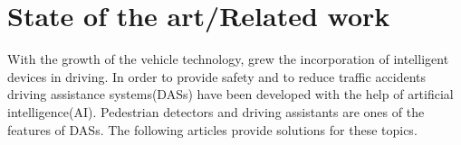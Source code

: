 \documentclass[runningheads,a4paper,11pt]{report}
\begin{document}
\chapter{State of the art/Related work}
\label{chapter:stateOfArt}



With the growth of the vehicle technology, grew the incorporation of intelligent devices in driving. In order to provide safety and to reduce traffic accidents driving assistance systems(DASs) have been developed with the help of artificial intelligence(AI). Pedestrian detectors and driving assistants are ones of the features of DASs. The following articles provide solutions for these topics.
\newline
\end{document}
